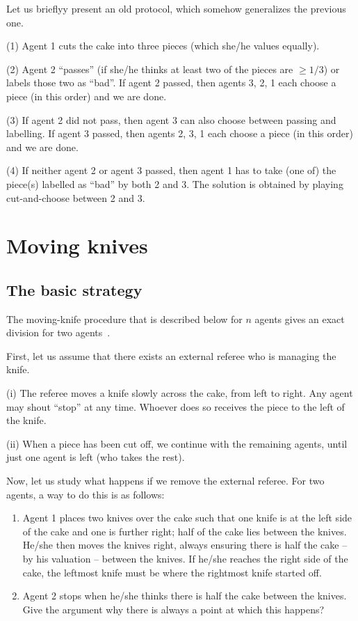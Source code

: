 Let us brieflyy present an old protocol, which somehow generalizes the previous one.

(1) Agent 1 cuts the cake into three pieces (which she/he values equally).

(2) Agent 2 “passes” (if she/he thinks at least two of the pieces are $\geq 1/3$) or labels those two as “bad”. 
If agent 2 passed, then agents 3, 2, 1 each choose a piece (in this order) and we are done.

(3) If agent 2 did not pass, then agent 3 can also choose between passing and labelling. 
If agent 3 passed, then agents 2, 3, 1 each choose a piece (in this order) and we are done.

(4) If neither agent 2 or agent 3 passed, then agent 1 has to take (one of) the piece(s) labelled as “bad” by both 2 and 3.
The solution is obtained by playing cut-and-choose between 2 and 3.


\section{Moving knives}

\subsection{The basic strategy}

The moving-knife procedure that is described below for $n$ agents gives an exact division for two agents~\cite{Dublins}. 

First, let us assume that there exists an external referee who is managing the knife. 


(i) The referee moves a knife slowly across the cake, from left to right. 
Any agent may shout “stop” at any time. Whoever does so receives the piece to the left of the knife.

(ii) When a piece has been cut off, we continue with the remaining agents, until just one agent is left (who takes the rest).
\bigskip 

Now, let us study what happens if we remove the external referee. 
For two agents, a way to do this is as follows:

\begin{enumerate}
\item 
Agent 1 places two knives over the cake such that one knife is at the left side of the cake and one is further right; 
half of the cake lies between the knives. 
He/she then moves the knives right, always ensuring there is half the cake – by his valuation – between the knives. 
If he/she reaches the right side of the cake, the leftmost knife must be where the rightmost knife started off. 
\item Agent 2 stops when he/she thinks there is half the cake between the knives. 
{\Denis Give the argument why there is always a point at which this happens?}
\end{enumerate}


